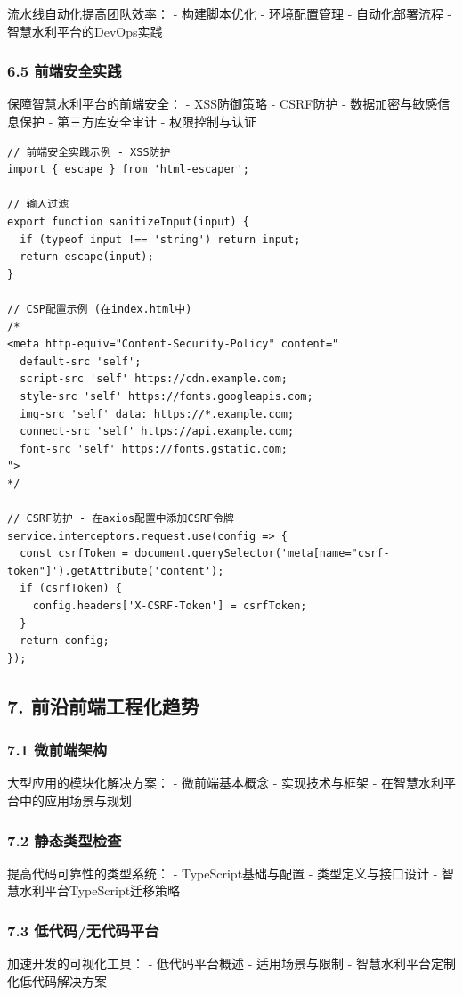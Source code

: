流水线自动化提高团队效率： - 构建脚本优化 - 环境配置管理 -
自动化部署流程 - 智慧水利平台的DevOps实践

\subsubsection{6.5
前端安全实践}\label{ux524dux7aefux5b89ux5168ux5b9eux8df5}

保障智慧水利平台的前端安全： - XSS防御策略 - CSRF防护 -
数据加密与敏感信息保护 - 第三方库安全审计 - 权限控制与认证

\begin{lstlisting}
// 前端安全实践示例 - XSS防护
import { escape } from 'html-escaper';

// 输入过滤
export function sanitizeInput(input) {
  if (typeof input !== 'string') return input;
  return escape(input);
}

// CSP配置示例 (在index.html中)
/*
<meta http-equiv="Content-Security-Policy" content="
  default-src 'self';
  script-src 'self' https://cdn.example.com;
  style-src 'self' https://fonts.googleapis.com;
  img-src 'self' data: https://*.example.com;
  connect-src 'self' https://api.example.com;
  font-src 'self' https://fonts.gstatic.com;
">
*/

// CSRF防护 - 在axios配置中添加CSRF令牌
service.interceptors.request.use(config => {
  const csrfToken = document.querySelector('meta[name="csrf-token"]').getAttribute('content');
  if (csrfToken) {
    config.headers['X-CSRF-Token'] = csrfToken;
  }
  return config;
});
\end{lstlisting}

\subsection{7.
前沿前端工程化趋势}\label{ux524dux6cbfux524dux7aefux5de5ux7a0bux5316ux8d8bux52bf}

\subsubsection{7.1 微前端架构}\label{ux5faeux524dux7aefux67b6ux6784}

大型应用的模块化解决方案： - 微前端基本概念 - 实现技术与框架 -
在智慧水利平台中的应用场景与规划

\subsubsection{7.2
静态类型检查}\label{ux9759ux6001ux7c7bux578bux68c0ux67e5}

提高代码可靠性的类型系统： - TypeScript基础与配置 - 类型定义与接口设计 -
智慧水利平台TypeScript迁移策略

\subsubsection{7.3
低代码/无代码平台}\label{ux4f4eux4ee3ux7801ux65e0ux4ee3ux7801ux5e73ux53f0}

加速开发的可视化工具： - 低代码平台概述 - 适用场景与限制 -
智慧水利平台定制化低代码解决方案
